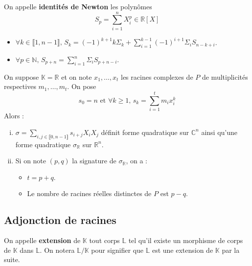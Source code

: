 
	\begin{definition}
		On appelle \textbf{identités de Newton} les polynômes
		\[ S_p = \sum_{i=1}^n X_i^p \in \mathbb{R}[X] \]
	\end{definition}

	\begin{proposition}
		\begin{itemize}
			\item $\forall k \in \llbracket 1, n-1 \rrbracket, \, S_k = (-1)^{k+1} k \Sigma_k + \sum_{i=1}^{k-1} (-1)^{i+1} \Sigma_i S_{n-k+i}$.
			\item $\forall p \in \mathbb{N}, \, S_{p+n} = \sum_{i=1}^n \Sigma_i S_{p+n-i}$.
		\end{itemize}
	\end{proposition}


	\begin{application}
		On suppose $\mathbb{K} = \mathbb{R}$ et on note $x_1, \dots, x_t$ les racines complexes de $P$ de multiplicités respectives $m_1, \dots, m_t$. On pose
		\[ s_0 = n \text{ et } \forall k \geq 1, \, s_k = \sum_{i=1}^t m_i x_i^k \]
		Alors :
		\begin{enumerate}[(i)]
			\item $\sigma = \sum_{i, j \in \llbracket 0, n-1 \rrbracket} s_{i+j} X_i X_j$ définit forme quadratique sur $\mathbb{C}^n$ ainsi qu'une forme quadratique $\sigma_{\mathbb{R}}$ sur $\mathbb{R}^n$.
			\item Si on note $(p,q)$ la signature de $\sigma_{\mathbb{R}}$, on a :
			\begin{itemize}
				\item $t = p + q$.
				\item Le nombre de racines réelles distinctes de $P$ est $p-q$.
			\end{itemize}
		\end{enumerate}
	\end{application}

	\subsection{Adjonction de racines}
	\label{144-1}


	\begin{definition}
		On appelle \textbf{extension} de $\mathbb{K}$ tout corps $\mathbb{L}$ tel qu'il existe un morphisme de corps de $\mathbb{K}$ dans $\mathbb{L}$. On notera $\mathbb{L} / \mathbb{K}$ pour signifier que $\mathbb{L}$ est une extension de $\mathbb{K}$ par la suite.
	\end{definition}

